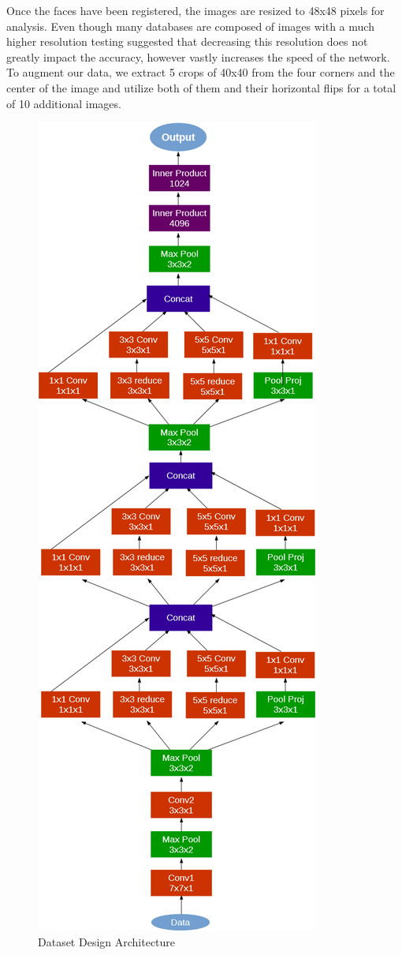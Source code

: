 Once the faces have been registered, the images are resized to 48x48 pixels for analysis. Even though many databases are composed of images with a much higher resolution testing suggested that decreasing this resolution does not greatly impact the accuracy, however vastly increases the speed of the network. To augment our data, we extract 5 crops of 40x40 from the four corners and the center of the image and utilize both of them and their horizontal flips for a total of 10 additional images.
\begin{figure}[h]
	\centering\includegraphics[scale=1.5]{images/dataset_design.png}
	\caption{Dataset Design Architecture}
\end{figure}
